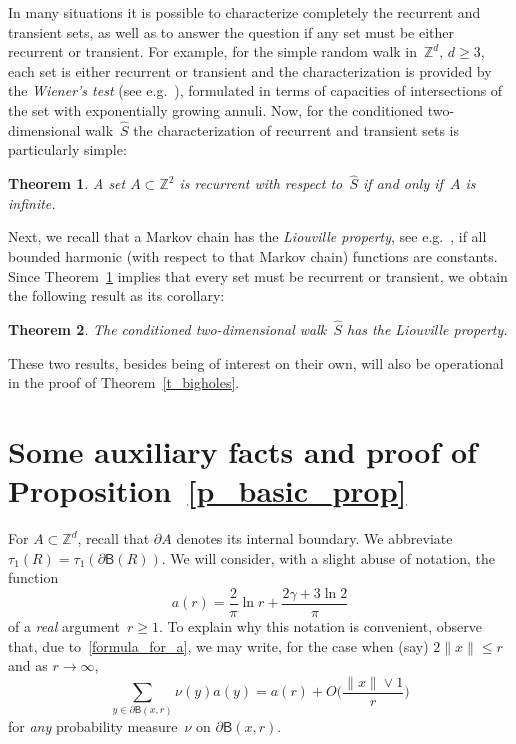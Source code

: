 \documentclass[10pt]{amsart}
\newtheorem{theo}{Theorem}[section]
\theoremstyle{definition}\newtheorem{defi}[theo]{Definition}\newtheorem{rema}[theo]{Remark}\newtheorem{exam}[theo]{Example}\newtheorem{exem}[theo]{Example}\newtheorem{nota}[theo]{Notation}
\newcommand{\1}[1]{{\mathbf 1}{\{#1\}}}
\newcommand{\Z}{\mathbb{Z}}
\newcommand{\s}{{\widehat S}}
\newcommand{\8}{{\infty}}
\newcommand{\B}{{\mathsf B}}
\begin{document}
In many situations it is possible to characterize completely the recurrent and transient sets, as well as to answer the question if any set must be either recurrent or transient. For example, for the simple random walk in~$\Z^d$, $d\geq 3$, each set is either recurrent or transient and the characterization is provided by the \emph{Wiener's test} (see e.g.~\cite[Corollary~6.5.9]{LL10}), formulated in terms of capacities of intersections of the set with exponentially growing annuli. Now, for the conditioned two-dimensional walk~$\s$ the characterization of recurrent and transient sets is particularly simple:

\begin{theo}\label{t_rec_trans}
A set $A\subset\Z^2$ is recurrent with respect to~$\s$ if and only if~$A$ is infinite.
\end{theo}

Next, we recall that a Markov chain has the \emph{Liouville property}, see e.g.~\cite[Chapter~IV]{Woess09}, if all bounded harmonic (with respect to that Markov chain) functions are constants. Since Theorem~\ref{t_rec_trans} implies that every set must be recurrent or transient, we obtain the following result as its corollary:

\begin{theo}\label{t_Liouville}
The conditioned two-dimensional walk~$\s$ has the Liouville property.
\end{theo}

These two results, besides being of interest on their own, will also be operational in the proof of Theorem~\ref{t_bigholes}.



\section{Some auxiliary facts and proof of Proposition~\ref{p_basic_prop}}\label{s_aux}

For $A\subset \Z^d$, recall that $\partial A$ denotes its internal boundary. We abbreviate $\tau_1(R) = \tau_1(\partial \B(R)).$ We will consider, with a slight abuse of notation, the function
\[
a(r)=\frac{2}{\pi}\ln r + \frac{2\gamma+ 3\ln 2}{\pi}
\]
of a \emph{real} argument~$r\geq 1$. To explain why this notation is convenient, observe that, due to~\eqref{formula_for_a}, we may write, for the case when (say) $2\|x\|\leq r$ and as $r\to\infty$,
\begin{equation}\label{real_a}
\sum_{y\in\partial \B(x,r)} \nu(y)a(y) = a(r) + O\Big(\frac{\|x\|\vee 1}{r}\Big)
\end{equation}
for \emph{any} probability measure~$\nu$ on $\partial \B(x,r)$.
\end{document}
